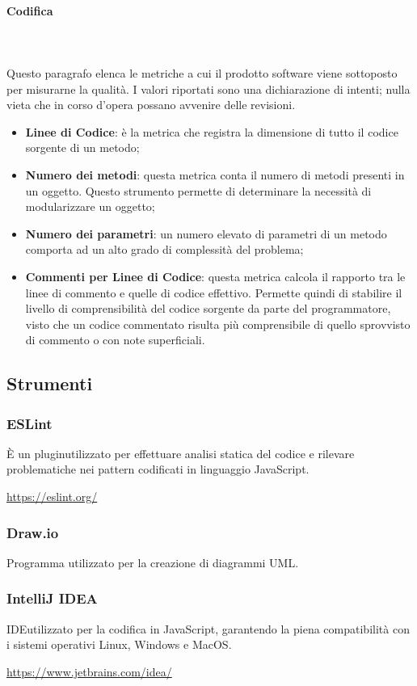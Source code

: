 			\paragraph{Codifica} \mbox{} \\ \mbox{} \\
			Questo paragrafo elenca le metriche a cui il prodotto software viene sottoposto per misurarne la qualità.
			I valori riportati sono una dichiarazione di intenti; nulla vieta che in corso d'opera possano avvenire delle revisioni.
			\begin{itemize}
			\item \textbf{Linee di Codice}: è la metrica che registra la dimensione di tutto il codice sorgente di un metodo;
			\item \textbf{Numero dei metodi}: questa metrica conta il numero di metodi presenti in un oggetto. Questo strumento permette di determinare la necessità di modularizzare un oggetto;
			\item \textbf{Numero dei parametri}: un numero elevato di parametri di un metodo comporta ad un alto grado di complessità del problema;
			\item \textbf{Commenti per Linee di Codice}: questa metrica calcola il rapporto tra le linee di commento e quelle di codice effettivo. Permette quindi di stabilire il livello di comprensibilità del codice sorgente da parte del programmatore, visto che un codice commentato risulta più comprensibile di quello sprovvisto di commento o con note superficiali.
			\end{itemize}
	\subsection{Strumenti}
	\subsubsection{ESLint}
	È un plugin\glo utilizzato per effettuare analisi statica del codice e rilevare problematiche nei pattern codificati in linguaggio JavaScript\glo. \\
	\centerline{\url{https://eslint.org/}}
	\subsubsection{Draw.io}
	Programma utilizzato per la creazione di diagrammi UML.
	\subsubsection{IntelliJ IDEA}
	IDE\glo utilizzato per la codifica in JavaScript, garantendo la piena compatibilità con i sistemi operativi Linux, Windows e MacOS.\\		
	\centerline{\url{https://www.jetbrains.com/idea/}}
